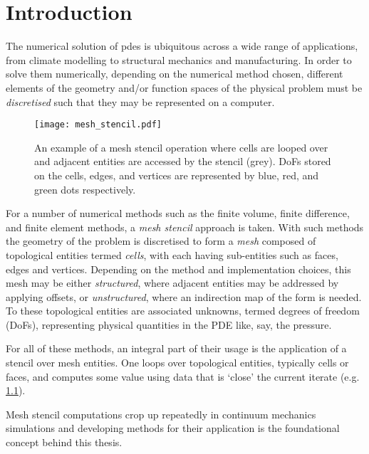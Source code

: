 \documentclass[thesis]{subfiles}
\begin{document}
\chapter{Introduction}
\label{chapter:introduction}

The numerical solution of \glspl{pde} is ubiquitous across a wide range of applications, from climate modelling to structural mechanics and manufacturing.
In order to solve them numerically, depending on the numerical method chosen, different elements of the geometry and/or function spaces of the physical problem must be \textit{discretised} such that they may be represented on a computer.


\begin{figure}
  \centering
  \texttt{[image: mesh\_stencil.pdf]}
  \caption{
    An example of a mesh stencil operation where cells are looped over and adjacent entities are accessed by the stencil (grey).
    DoFs stored on the cells, edges, and vertices are represented by blue, red, and green dots respectively.
  }
  \label{fig:mesh_stencil}
\end{figure}

For a number of numerical methods such as the finite volume, finite difference, and finite element methods, a \textit{mesh stencil} approach is taken.
With such methods the geometry of the problem is discretised to form a \textit{mesh} composed of topological entities termed \textit{cells}, with each having sub-entities such as faces, edges and vertices.
Depending on the method and implementation choices, this mesh may be either \textit{structured}, where adjacent entities may be addressed by applying offsets, or \textit{unstructured}, where an indirection map of the form  is needed.
To these topological entities are associated unknowns, termed degrees of freedom (DoFs), representing physical quantities in the PDE like, say, the pressure.

For all of these methods, an integral part of their usage is the application of a stencil over mesh entities.
One loops over topological entities, typically cells or faces, and computes some value using data that is `close' the current iterate (e.g. \cref{fig:mesh_stencil}).

Mesh stencil computations crop up repeatedly in continuum mechanics simulations and developing methods for their application is the foundational concept behind this thesis.
\end{document}
